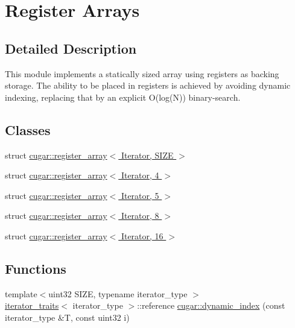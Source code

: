 \hypertarget{group___register_arrays_module}{}\section{Register Arrays}
\label{group___register_arrays_module}


\subsection{Detailed Description}
This module implements a statically sized array using registers as backing storage. The ability to be placed in registers is achieved by avoiding dynamic indexing, replacing that by an explicit O(log(\+N)) binary-\/search. \subsection*{Classes}
\begin{DoxyCompactItemize}
\item 
struct \hyperlink{structcugar_1_1register__array}{cugar\+::register\+\_\+array$<$ Iterator, S\+I\+Z\+E $>$}
\item 
struct \hyperlink{structcugar_1_1register__array_3_01_iterator_00_014_01_4}{cugar\+::register\+\_\+array$<$ Iterator, 4 $>$}
\item 
struct \hyperlink{structcugar_1_1register__array_3_01_iterator_00_015_01_4}{cugar\+::register\+\_\+array$<$ Iterator, 5 $>$}
\item 
struct \hyperlink{structcugar_1_1register__array_3_01_iterator_00_018_01_4}{cugar\+::register\+\_\+array$<$ Iterator, 8 $>$}
\item 
struct \hyperlink{structcugar_1_1register__array_3_01_iterator_00_0116_01_4}{cugar\+::register\+\_\+array$<$ Iterator, 16 $>$}
\end{DoxyCompactItemize}
\subsection*{Functions}
\begin{DoxyCompactItemize}
\item 
{\footnotesize template$<$uint32 S\+I\+ZE, typename iterator\+\_\+type $>$ }\\\hyperlink{structcugar_1_1iterator__traits}{iterator\+\_\+traits}$<$ iterator\+\_\+type $>$\+::reference \hyperlink{group___register_arrays_module_ga312bfb0737a477266b603285bac022df}{cugar\+::dynamic\+\_\+index} (const iterator\+\_\+type \&T, const uint32 i)
\end{DoxyCompactItemize}


